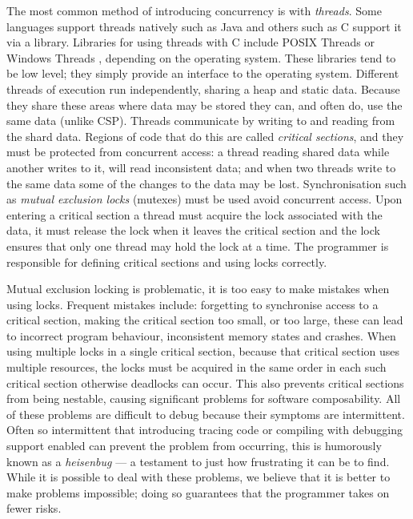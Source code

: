 The most common method of introducing concurrency is with \emph{threads}.
Some languages support threads natively such as Java \citep{java-threads}
and others such as C \citep{c} support it via a library.
Libraries for using threads with C include
POSIX Threads \citep{butenhof1997:pthreads} or Windows
Threads \citep{winthreads}, depending on the operating system.
These libraries tend to be low level;
they simply provide an interface to the operating system.
Different threads of execution run independently,
sharing a heap and static data.
Because they share these areas where data may be stored they can, and often do,
use the same data (unlike CSP).
Threads communicate by writing to and reading from the shard data.
Regions of code that do this are called \emph{critical sections},
and they must be protected from concurrent access:
a thread reading shared data while another writes to it, will read
inconsistent data;
and when two threads write to the same data some of the changes to the data
may be lost.
Synchronisation such as \emph{mutual exclusion locks} (mutexes)
\citep{Dijkstra:Mutex} must be used avoid concurrent access.
Upon entering a critical section a thread must acquire the lock associated with
the data,
it must release the lock when it leaves the critical section and the lock
ensures that only one thread may hold the lock at a time.
The programmer is responsible for defining critical sections and using locks
correctly.

Mutual exclusion locking is problematic,
it is too easy to make mistakes when using locks.
Frequent mistakes include: forgetting to synchronise access to a critical
section,
making the critical section too small, or too large,
these can lead to incorrect program behaviour, inconsistent memory states and
crashes. 
When using multiple locks in a single critical section,
because that critical section uses multiple resources,
the locks must be acquired in the same order in each such critical section
otherwise deadlocks can occur.
This also prevents critical sections from being nestable,
causing significant problems for software composability.
All of these problems are difficult to debug because their symptoms are
intermittent.
Often so intermittent that introducing tracing code or compiling with debugging
support enabled can prevent the problem from occurring,
this is humorously known as a \emph{heisenbug} ---
a testament to just how frustrating it can be to find.
While it is possible to deal with these problems,
we believe that it is better to make problems impossible;
doing so guarantees that the programmer takes on fewer risks.

